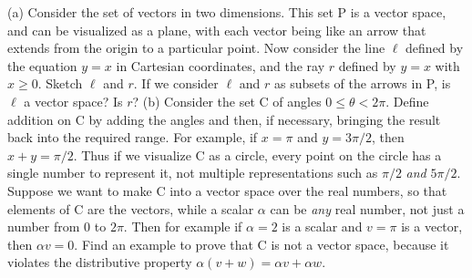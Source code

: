 (a) Consider the set of vectors in two dimensions. This set P is a
vector space, and can be visualized as a plane, with each vector being
like an arrow that extends from the origin to a particular point. Now
consider the line $\ell$ defined by the equation $y=x$ in Cartesian
coordinates, and the ray $r$ defined by $y=x$ with $x\ge0$. Sketch
$\ell$ and $r$.  If we consider $\ell$ and $r$ as subsets of the
arrows in P, is $\ell$ a vector space? Is $r$?\hwendpart
%
(b) Consider the set C of angles $0\le\theta<2\pi$. Define addition on
C by adding the angles and then, if necessary, bringing the result
back into the required range. For example, if $x=\pi$ and $y=3\pi/2$,
then $x+y=\pi/2$.  Thus if we visualize C as a circle, every point on
the circle has a single number to represent it, not multiple
representations such as $\pi/2$ \emph{and} $5\pi/2$.  Suppose we want
to make C into a vector space over the real numbers, so that elements
of C are the vectors, while a scalar $\alpha$ can be \emph{any} real
number, not just a number from $0$ to $2\pi$. Then for example if
$\alpha=2$ is a scalar and $v=\pi$ is a vector, then $\alpha v=0$.
Find an example to prove that C is not a vector space, because it
violates the distributive property $\alpha(v+w)=\alpha v+\alpha
w$.\hwendpart
